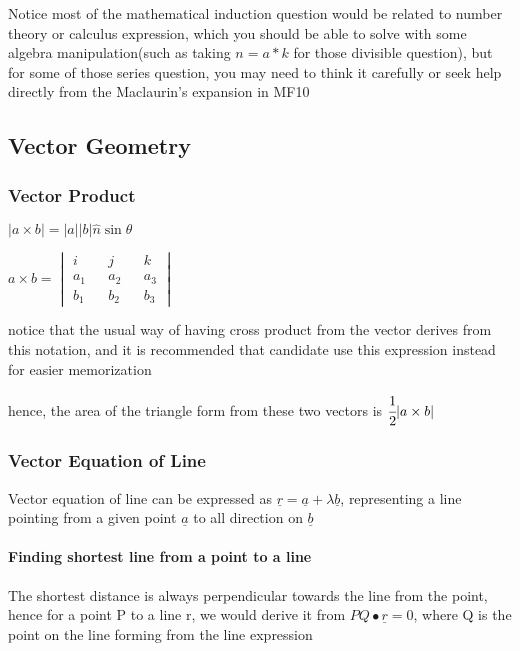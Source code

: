 \documentclass[]{article}
\let\oldparagraph\paragraph
\renewcommand{\paragraph}[1]{\oldparagraph{#1}\mbox{}}
\begin{document}
Notice most of the mathematical induction question would be related to
number theory or calculus expression, which you should be able to solve
with some algebra manipulation(such as taking \(n = a*k\) for those
divisible question), but for some of those series question, you may need
to think it carefully or seek help directly from the Maclaurin's
expansion in MF10

\subsection{Vector Geometry}\label{header-n264}

\subsubsection{Vector Product}\label{header-n265}

\(|a\times b| = |a||b|\hat{n}\sin\theta \)

\(a \times b = \begin{vmatrix} i&&j&&k\\a_1&&a_2&&a_3\\b_1&&b_2&&b_3\end{vmatrix}\)

notice that the usual way of having cross product from the vector
derives from this notation, and it is recommended that candidate use
this expression instead for easier memorization

hence, the area of the triangle form from these two vectors is
\(\cfrac{1}{2} |a\times b|\)

\subsubsection{Vector Equation of Line}\label{header-n270}

Vector equation of line can be expressed as
\(\underline{r} = \underline{a}+\lambda \underline{b}\), representing a
line pointing from a given point \(\underline{a}\) to all direction on
\(\underline{b}\)

\paragraph{Finding shortest line from a point to a
line}\label{header-n272}

The shortest distance is always perpendicular towards the line from the
point, hence for a point P to a line r, we would derive it from
\(PQ\bullet \underline{r} = 0\), where Q is the point on the line
forming from the line expression
\end{document}
